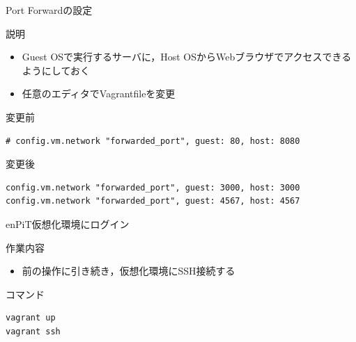 \documentclass[t, aspectratio=169]{beamer}
\begin{document}
\begin{frame}[fragile,label=sec-1-5-3]{Port Forwardの設定}
 \begin{block}{説明}
\begin{itemize}
\item Guest OSで実行するサーバに，Host OSからWebブラウザでアクセスできるようにしておく
\item 任意のエディタでVagrantfileを変更
\end{itemize}
\end{block}
\begin{block}{変更前}
\begin{verbatim}
# config.vm.network "forwarded_port", guest: 80, host: 8080
\end{verbatim}
\end{block}

\begin{block}{変更後}
\begin{verbatim}
config.vm.network "forwarded_port", guest: 3000, host: 3000
config.vm.network "forwarded_port", guest: 4567, host: 4567
\end{verbatim}
\end{block}
\end{frame}

\begin{frame}[fragile,label=sec-1-5-4]{enPiT仮想化環境にログイン}
 \begin{block}{作業内容}
\begin{itemize}
\item 前の操作に引き続き，仮想化環境にSSH接続する
\end{itemize}
\end{block}
\begin{block}{コマンド}
\begin{verbatim}
vagrant up
vagrant ssh
\end{verbatim}
\end{block}
\end{frame}
\end{document}
